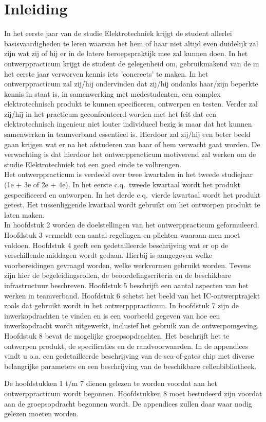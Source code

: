 \section{Inleiding}
In het eerste jaar van de studie Elektrotechniek krijgt de student allerlei
basisvaardigheden te leren waarvan het hem of haar niet altijd even duidelijk
 zal zijn wat zij of hij er in de latere beroepspraktijk mee zal kunnen doen.
In het ontwerppracticum krijgt de student de gelegenheid om, gebruikmakend van de in het eerste jaar verworven kennis iets 'concreets' te maken.
In het ontwerppracticum zal zij/hij ondervinden dat zij/hij ondanks haar/zijn beperkte kennis in staat is, in samenwerking met medestudenten, een complex elektrotechnisch produkt te kunnen
specificeren, ontwerpen en testen. Verder zal zij/hij in het practicum
 geconfronteerd worden met het feit dat een elektrotechnisch ingenieur
 niet louter individueel bezig is maar dat het kunnen samenwerken in teamverband essentieel is.
Hierdoor zal zij/hij een beter beeld gaan krijgen wat er na het afstuderen van haar of hem verwacht gaat worden. De verwachting is dat hierdoor het ontwerppracticum motiverend zal werken om de studie Elektrotechniek tot een goed einde te volbrengen.\\

Het ontwerppracticum is verdeeld over twee kwartalen in het tweede studiejaar
(1e + 3e of 2e + 4e). 
In het eerste c.q.\ tweede kwartaal wordt het produkt gespecificeerd en ontworpen.
In het derde c.q.\ vierde kwartaal wordt het produkt getest. Het tussenliggende  kwartaal wordt
gebruikt om het ontworpen produkt te laten maken.\\

In hoofdstuk 2 worden de doelstellingen van het ontwerppracticum geformuleerd.
Hoofdstuk 3 vermeldt een aantal regelingen en plichten waaraan men moet voldoen.
Hoofdstuk 4 geeft
 een gedetailleerde beschrijving wat er op de verschillende middagen wordt gedaan. Hierbij is aangegeven welke voorbereidingen gevraagd worden, welke werkvormen gebruikt worden. Tevens zijn hier de begeleidingsrollen, de beoordelingscriteria en de beschikbare infrastructuur beschreven.
Hoofdstuk 5 be\-schrijft een aantal aspecten van het werken in teamverband.
Hoofdstuk 6 schetst het beeld van het IC-ontwerptrajekt zoals dat gebruikt
 wordt in het ontwerpppracticum.
In hoofdstuk 7 zijn de inwerkopdrachten te vinden en is een voorbeeld
gegeven van hoe een inwerkopdracht wordt uitgewerkt, inclusief het
gebruik van de ontwerpomgeving.
Hoofdstuk 8 bevat de mogelijke groepsopdrachten. 
Het beschrijft het te ontwerpen produkt, de specificaties en de randvoorwaarden.
In de appendices vindt u o.a. een gedetailleerde beschrijving van de sea-of-gates 
chip met diverse belangrijke parameters 
en een beschrijving van de beschikbare cellenbibliotheek.

De hoofdstukken 1 t/m 7 dienen gelezen te worden voordat aan het
ontwerppracticum wordt begonnen.
Hoofdstukken 8 moet bestudeerd zijn voordat aan de groepsopdracht begonnen 
wordt.
De appendices zullen daar waar nodig gelezen moeten worden.

\cleardoublepage
